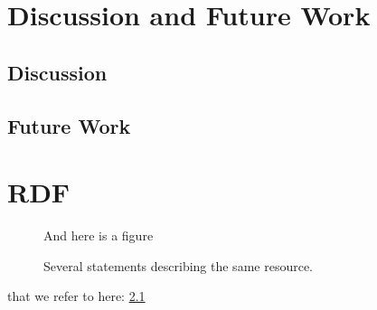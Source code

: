 \documentclass[a4paper,11pt]{kth-mag}
\begin{document}
\chapter{Discussion and Future Work}

\section{Discussion}

\section{Future Work}




\appendix
\addappheadtotoc
\chapter{RDF}\label{appA}

\begin{figure}[ht]
\begin{center}
And here is a figure
\caption{\small{Several statements describing the same resource.}}\label{RDF_4}
\end{center}
\end{figure}

that we refer to here: \ref{RDF_4}
\end{document}
